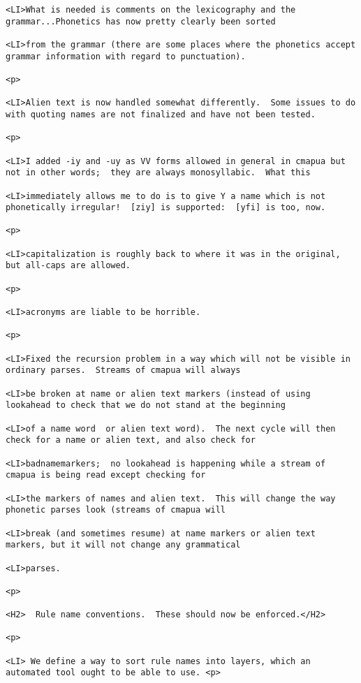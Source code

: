 \documentclass[12pt]{article}
\begin{document}
\begin{lstlisting}
<LI>What is needed is comments on the lexicography and the grammar...Phonetics has now pretty clearly been sorted

<LI>from the grammar (there are some places where the phonetics accept grammar information with regard to punctuation).

<p>

<LI>Alien text is now handled somewhat differently.  Some issues to do with quoting names are not finalized and have not been tested.

<p>

<LI>I added -iy and -uy as VV forms allowed in general in cmapua but not in other words;  they are always monosyllabic.  What this

<LI>immediately allows me to do is to give Y a name which is not phonetically irregular!  [ziy] is supported:  [yfi] is too, now.

<p>

<LI>capitalization is roughly back to where it was in the original, but all-caps are allowed.

<p>

<LI>acronyms are liable to be horrible.

<p>

<LI>Fixed the recursion problem in a way which will not be visible in ordinary parses.  Streams of cmapua will always

<LI>be broken at name or alien text markers (instead of using lookahead to check that we do not stand at the beginning

<LI>of a name word  or alien text word).  The next cycle will then check for a name or alien text, and also check for

<LI>badnamemarkers;  no lookahead is happening while a stream of cmapua is being read except checking for

<LI>the markers of names and alien text.  This will change the way phonetic parses look (streams of cmapua will

<LI>break (and sometimes resume) at name markers or alien text markers, but it will not change any grammatical

<LI>parses.

<p>

<H2>  Rule name conventions.  These should now be enforced.</H2>

<p>

<LI> We define a way to sort rule names into layers, which an automated tool ought to be able to use. <p>


\end{lstlisting}
\end{document}
